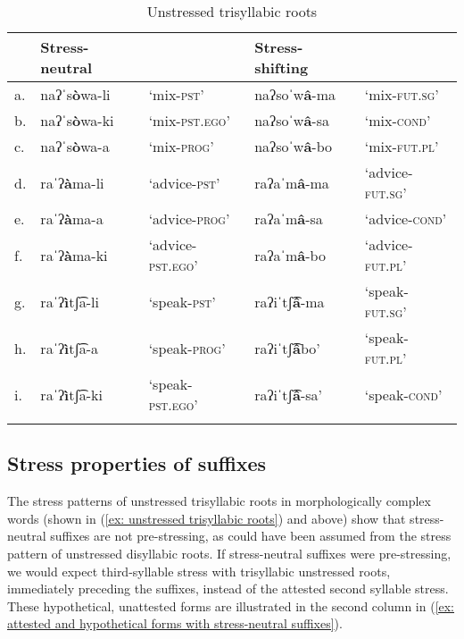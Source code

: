 \begin{table}
\caption{Unstressed trisyllabic roots}
\label{tab:unstressed-trisyllabic-2}

\begin{tabularx}{\textwidth}{llXll}
\lsptoprule
&\textbf{Stress-neutral} &  & \textbf{Stress-shifting} &  \\
\midrule
a.& naʔˈs\textbf{ò}wa-li  &   ‘mix-\textsc{pst}'  &  naʔsoˈw\textbf{â}{}-ma  & ‘mix-\textsc{fut.sg}’\\
b.& naʔˈs\textbf{ò}wa-ki  & ‘mix-\textsc{pst.ego}’   & naʔsoˈw\textbf{â}{}-sa   & ‘mix-\textsc{cond}’\\
c.& naʔˈs\textbf{ò}wa-a  &   ‘mix-\textsc{prog}’   & naʔsoˈw\textbf{â}{}-bo  & ‘mix-\textsc{fut.pl}’\\
d.& raˈʔ\textbf{à}ma-li  & ‘advice-\textsc{pst}’   & raʔaˈm\textbf{â}{}-ma   & ‘advice-\textsc{fut.sg}’\\
e.& raˈʔ\textbf{à}ma-a  & ‘advice-\textsc{prog}’ & raʔaˈm\textbf{â}{}-sa & ‘advice-\textsc{cond}’\\
f.& raˈʔ\textbf{à}ma-ki  &    ‘advice-\textsc{pst.ego}’ & raʔaˈm\textbf{â}{}-bo  & ‘advice-\textsc{fut.pl}’\\
g.& raˈʔ\textbf{ì}tʃ͡a-li & ‘speak\textsc{-pst}’ &  raʔiˈtʃ͡\textbf{â}-ma & ‘speak\textsc{-fut.sg}'\\
h.& raˈʔ\textbf{ì}tʃ͡a-a &‘speak\textsc{-prog}' &   raʔiˈtʃ͡\textbf{â}{}bo’ &  ‘speak-\textsc{fut.pl}'\\
i.& raˈʔ\textbf{ì}tʃ͡a-ki & ‘speak-\textsc{pst.ego}'&  raʔiˈtʃ͡\textbf{â}{}-sa' &  ‘speak-\textsc{cond}'\\
\lspbottomrule
\end{tabularx}
\end{table}

\subsection{Stress properties of suffixes}
\label{subsubsec*: stress properties of suffixes}

The stress patterns of unstressed trisyllabic roots in morphologically complex words (shown in (\ref{ex: unstressed trisyllabic roots}) and  above) show that stress-neutral suffixes are not pre-stressing, as could have been assumed from the stress pattern of unstressed disyllabic roots. If stress-neutral suffixes were pre-stressing, we would expect third-syllable stress with trisyllabic unstressed roots, immediately preceding the suffixes, instead of the attested second syllable stress. These hypothetical, unattested forms are illustrated in the second column in (\ref{ex: attested and hypothetical forms with stress-neutral suffixes}).

